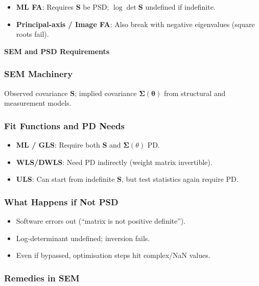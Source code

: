 \documentclass[
  12pt,
]{article}
\providecommand{\tightlist}{%
  \setlength{\itemsep}{0pt}\setlength{\parskip}{0pt}}
\theoremstyle{plain}
\theoremstyle{definition}
\theoremstyle{remark}
\begin{document}
\begin{itemize}
\tightlist
\item
  \textbf{ML FA}: Requires \(\mathbf{S}\) be PSD;
  \(\log \det \mathbf{S}\) undefined if indefinite.
\item
  \textbf{Principal-axis / Image FA}: Also break with negative
  eigenvalues (square roots fail).
\end{itemize}

\textbf{SEM and PSD Requirements}

\subsubsection{SEM Machinery}\label{sem-machinery}

Observed covariance \(\mathbf{S}\); implied covariance
\(\boldsymbol\Sigma(\boldsymbol\theta)\) from structural and measurement
models.

\subsubsection{Fit Functions and PD
Needs}\label{fit-functions-and-pd-needs}

\begin{itemize}
\tightlist
\item
  \textbf{ML / GLS}: Require both \(\mathbf{S}\) and
  \(\boldsymbol\Sigma(\theta)\) PD.
\item
  \textbf{WLS/DWLS}: Need PD indirectly (weight matrix invertible).
\item
  \textbf{ULS}: Can start from indefinite \(\mathbf{S}\), but test
  statistics again require PD.
\end{itemize}

\subsubsection{What Happens if Not PSD}\label{what-happens-if-not-psd}

\begin{itemize}
\tightlist
\item
  Software errors out (``matrix is not positive definite'').
\item
  Log-determinant undefined; inversion fails.
\item
  Even if bypassed, optimisation steps hit complex/NaN values.
\end{itemize}

\subsubsection{Remedies in SEM}\label{remedies-in-sem}
\end{document}
